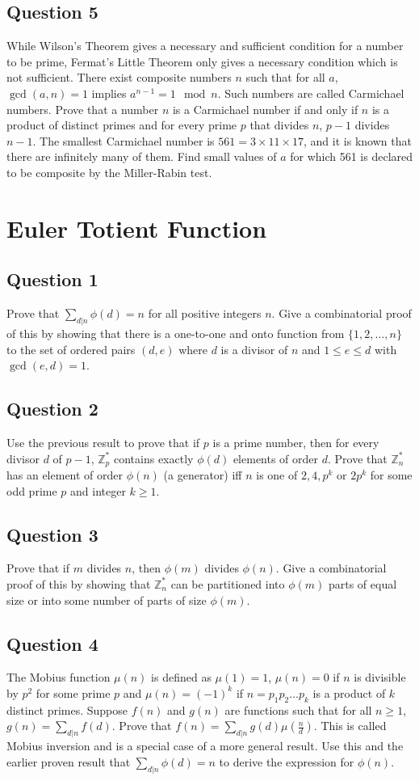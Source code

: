 \documentclass[12pt]{report}
\begin{document}
\section*{Question 5}
While Wilson's Theorem gives a necessary and sufficient condition for a number to be prime, Fermat's Little Theorem only gives a necessary condition which is not sufficient. There exist composite numbers $n$ such that for all $a$, $\gcd(a, n) = 1$ implies $a^{n - 1} = 1 \mod n$. Such numbers are called Carmichael numbers. Prove that a number $n$ is a Carmichael number if and only if $n$ is a product of distinct primes and for every prime $p$ that divides $n$, $p - 1$ divides $n - 1$. The smallest Carmichael number is $561 = 3 \times 11 \times 17$, and it is known that there are infinitely many of them. Find small values of $a$ for which 561 is declared to be composite by the Miller-Rabin test.
\chapter{Euler Totient Function}
\section*{Question 1}
Prove that $\sum\limits_{d | n} \phi(d) = n$ for all positive integers $n$. Give a combinatorial proof of this by showing that there is a one-to-one and onto function from $\{1, 2, \dots, n\}$ to the set of ordered pairs $(d, e)$ where $d$ is a divisor of $n$ and $1 \leq e \leq d$ with $\gcd(e, d) = 1$.
\section*{Question 2}
Use the previous result to prove that if $p$ is a prime number, then for every divisor $d$ of $p - 1$, $\mathbb{Z}_{p}^{*}$ contains exactly $\phi(d)$ elements of order $d$. Prove that $\mathbb{Z}_{n}^{*}$ has an element of order $\phi(n)$ (a generator) iff $n$ is one of $2, 4, p^{k}$ or $2p^{k}$ for some odd prime $p$ and integer $k \geq 1$.
\section*{Question 3}
Prove that if $m$ divides $n$, then $\phi(m)$ divides $\phi(n)$. Give a combinatorial proof of this by showing that $\mathbb{Z}_{n}^{*}$ can be partitioned into $\phi(m)$ parts of equal size or into some number of parts of size $\phi(m)$.
\section*{Question 4}
The Mobius function $\mu(n)$ is defined as $\mu(1) = 1$, $\mu(n) = 0$ if $n$ is divisible by $p^2$ for some prime $p$ and $\mu(n) = (-1)^{k}$ if $n = p_{1}p_{2}\dots p_{k}$ is a product of $k$ distinct primes. Suppose $f(n)$ and $g(n)$ are functions such that for all $n \geq 1$, $g(n) = \sum\limits_{d | n} f(d)$. Prove that $f(n) = \sum\limits_{d | n}g(d)\mu(\frac{n}{d})$. This is called Mobius inversion and is a special case of a more general result. Use this and the earlier proven result that $\sum\limits_{d | n} \phi(d) = n$ to derive the expression for $\phi(n)$.
\end{document}
